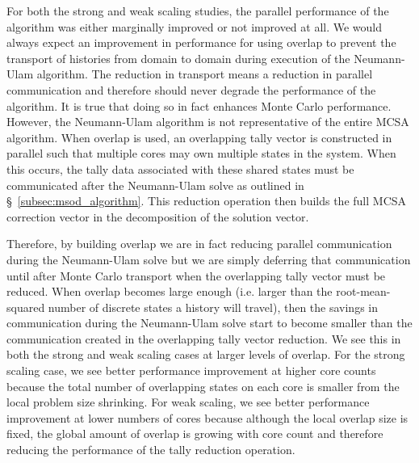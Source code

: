 For both the strong and weak scaling studies, the parallel performance
of the algorithm was either marginally improved or not improved at
all. We would always expect an improvement in performance for using
overlap to prevent the transport of histories from domain to domain
during execution of the Neumann-Ulam algorithm. The reduction in
transport means a reduction in parallel communication and therefore
should never degrade the performance of the algorithm. It is true that
doing so in fact enhances Monte Carlo performance. However, the
Neumann-Ulam algorithm is not representative of the entire MCSA
algorithm. When overlap is used, an overlapping tally vector is
constructed in parallel such that multiple cores may own multiple
states in the system. When this occurs, the tally data associated with
these shared states must be communicated after the Neumann-Ulam solve
as outlined in \S~\ref{subsec:msod_algorithm}. This reduction
operation then builds the full MCSA correction vector in the
decomposition of the solution vector. 

Therefore, by building overlap we are in fact reducing parallel
communication during the Neumann-Ulam solve but we are simply
deferring that communication until after Monte Carlo transport when
the overlapping tally vector must be reduced. When overlap becomes
large enough (i.e. larger than the root-mean-squared number of
discrete states a history will travel), then the savings in
communication during the Neumann-Ulam solve start to become smaller
than the communication created in the overlapping tally vector
reduction. We see this in both the strong and weak scaling cases at
larger levels of overlap. For the strong scaling case, we see better
performance improvement at higher core counts because the total number
of overlapping states on each core is smaller from the local problem
size shrinking. For weak scaling, we see better performance
improvement at lower numbers of cores because although the local
overlap size is fixed, the global amount of overlap is growing with
core count and therefore reducing the performance of the tally
reduction operation. 

